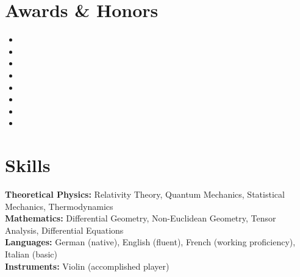 \documentclass[letterpaper,11pt]{article}
\begin{document}

\ifcv
\section*{Awards \& Honors}

\begin{itemize}
    \item {}
    \item {}
    \item {}
    \item {}
    \item {}
    \item {}
    \item {}
    \item {}
\end{itemize}
\fi


\ifcv
\section*{Skills}

\textbf{Theoretical Physics:} Relativity Theory, Quantum Mechanics, Statistical Mechanics, Thermodynamics \\
\textbf{Mathematics:} Differential Geometry, Non-Euclidean Geometry, Tensor Analysis, Differential Equations \\
\textbf{Languages:} German (native), English (fluent), French (working proficiency), Italian (basic) \\
\textbf{Instruments:} Violin (accomplished player)
\fi

\end{document}
